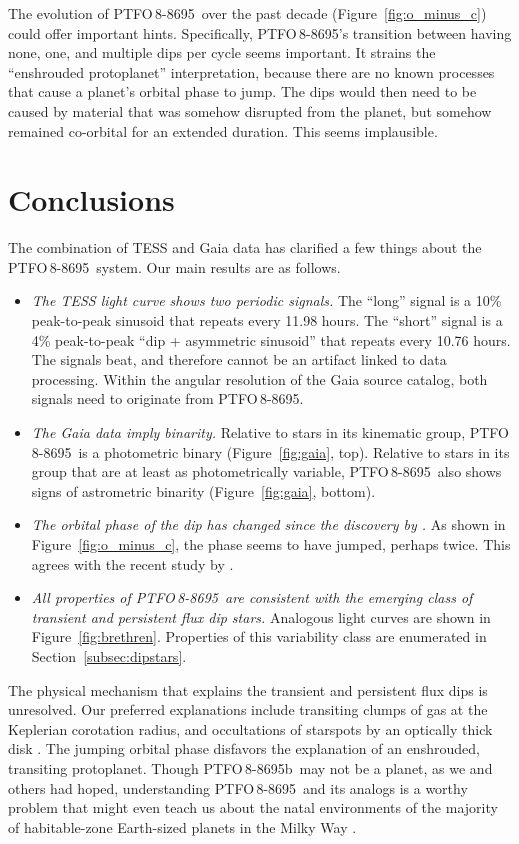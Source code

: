 \documentclass[12pt,twocolumn,tighten]{aastex62}
\newcommand{\ptfo}{PTFO$\,$8-8695}
\newcommand{\ptfob}{PTFO$\,$8-8695b}
\begin{document}
The evolution of \ptfo\ over the past decade
(Figure~\ref{fig:o_minus_c}) could offer important hints.
Specifically, \ptfo's transition between having none, one, and
multiple dips per cycle seems important.  It strains the ``enshrouded
protoplanet'' interpretation, because there are no known processes
that cause a planet's orbital phase to jump.  The dips would then need
to be caused by material that was somehow disrupted from the planet,
but somehow remained co-orbital for an extended duration. This seems
implausible.

\section{Conclusions}
\label{sec:conclusions}

The combination of TESS and Gaia data has clarified a few things about
the \ptfo\ system.  Our main results are as follows.
\begin{itemize}
  \item {\it The TESS light curve shows two periodic signals.} The
    ``long'' signal is a 10\% peak-to-peak sinusoid that repeats every
    11.98 hours.  The ``short'' signal is a 4\% peak-to-peak ``dip +
    asymmetric sinusoid'' that repeats every 10.76 hours. The signals
    beat, and therefore cannot be an artifact linked to data
    processing.  Within the angular resolution of the Gaia source
    catalog, both signals need to originate from \ptfo.
  \item {\it The Gaia data imply binarity.} Relative to stars in its
    kinematic group, \ptfo\ is a photometric binary
    (Figure~\ref{fig:gaia}, top).  Relative to stars in its group that
    are at least as photometrically variable, \ptfo\ also shows signs
    of astrometric binarity (Figure~\ref{fig:gaia}, bottom).
  \item {\it The orbital phase of the dip has changed since the
    discovery by \citet{van_eyken_ptf_2012}.} As shown in
    Figure~\ref{fig:o_minus_c}, the phase seems to have jumped,
    perhaps twice. This agrees with the recent study by
    \citet{tanimoto_evidence_2020}.
  \item {\it All properties of \ptfo\ are consistent with the emerging
    class of transient and persistent flux dip stars.} Analogous
    light curves are shown in Figure~\ref{fig:brethren}.  Properties of
    this variability class are enumerated in
    Section~\ref{subsec:dipstars}.
\end{itemize}

The physical mechanism that explains the transient and persistent flux
dips is unresolved. Our preferred explanations include transiting
clumps of gas at the Keplerian corotation radius, and occultations of
starspots by an optically thick disk \citep[{\it
e.g.},][]{stauffer_orbiting_2017,david_transient_2017,zhan_complex_2019}.
The jumping orbital phase disfavors the explanation of an enshrouded,
transiting protoplanet.  Though \ptfob\ may not be a planet, as we and
others had hoped, understanding \ptfo\ and its analogs is a worthy
problem that might even teach us about the natal environments of the
majority of habitable-zone Earth-sized planets in the Milky Way
\citep{dressing_occurrence_2013}.
\end{document}
